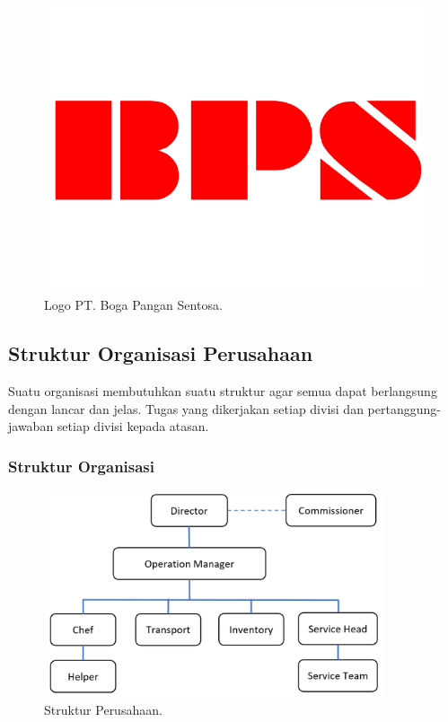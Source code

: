 \begin{figure}[htbp]
\begin{center}
\includegraphics{img/logo-bps.png}
\caption{Logo PT. Boga Pangan Sentosa.}
\label{gambar:logo-bps}
\end{center}
\end{figure}

\pagebreak

\subsection{Struktur Organisasi Perusahaan}

Suatu organisasi membutuhkan suatu struktur agar semua dapat berlangsung dengan lancar dan jelas. 
Tugas yang dikerjakan setiap divisi dan pertanggung-jawaban setiap divisi kepada atasan.

\subsubsection{Struktur Organisasi }

\begin{figure}[htbp]
    \begin{center}
    \includegraphics[width=10cm]{img/struktur-org.png}
    \caption{Struktur Perusahaan.}
    \label{gambar:struktur-org}
    \end{center}
\end{figure}

